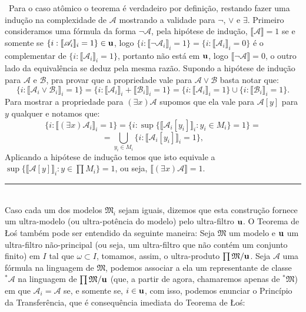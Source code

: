 \documentclass[12pt,a4paper]{article}
\def\dem{\par\smallbreak\noindent {\textit{ Demonstração:}} \ }
\def\eop{\hfill\rule{2.5mm}{2.5mm} \\ }
\theoremstyle{definition}
\begin{document}
\dem Para o caso atômico o teorema é verdadeiro por definição, restando fazer uma indução na complexidade de $\mathscr{A}$ mostrando a validade para $\neg$, $\vee$ e $\exists$. Primeiro consideramos uma fórmula da forma $\neg \mathscr{A}$, pela hipótese de indução, $ \llbracket \mathscr{A} \rrbracket=1$ se e somente se $\{i: \llbracket \mathscr{A}_i \rrbracket_i=1\}\in \bf{u}$, logo $\{i: \llbracket \neg \mathscr{A}_i \rrbracket_i=1\}=\{i: \llbracket \mathscr{A}_i \rrbracket_i=0\}$ é o complementar de  $\{i: \llbracket \mathscr{A}_i \rrbracket_i=1\}$, portanto não está em  $\bf{u}$, logo $ \llbracket \neg \mathscr{A} \rrbracket=0$, o outro lado da equivalência se deduz pela mesma razão. Supondo a hipótese de indução para $ \mathscr{A}$ e $ \mathscr{B}$, pra provar que a propriedade vale para $\mathscr{A} \vee \mathscr{B}$ basta notar que: $$\{i: \llbracket \mathscr{A}_i \vee \mathscr{B}_i \rrbracket_i=1\}=\{i: \llbracket \mathscr{A}_i \rrbracket_i + \llbracket \mathscr{B}_i \rrbracket_i=1\}=\{i: \llbracket \mathscr{A}_i \rrbracket_i =1\} \cup  \{ i: \llbracket \mathscr{B}_i \rrbracket_i=1\}.$$ Para mostrar a propriedade para $(\exists x)\mathscr{A}$ supomos que ela vale para $\mathscr{A}[y]$ para $y$ qualquer e notamos que: $$\{i: \llbracket (\exists x)\mathscr{A}_i \rrbracket_i=1\}= \{i:\sup \{ \llbracket \mathscr{A}_i[y_i] \rrbracket_i:y_i\in M_i\}=1\}=$$ $$=\bigcup_{y_i\in M_i} \{i: \llbracket \mathscr{A}_i[y_i] \rrbracket_i=1\},$$ Aplicando a hipótese de indução temos que isto equivale a $\sup \{ \llbracket \mathscr{A}[y] \rrbracket_i:y\in \prod M_i\}=1$, ou seja, $ \llbracket (\exists x)\mathscr{A}  \rrbracket = 1$. \eop

Caso cada um dos modelos $\mathfrak{M}_i$ sejam iguais, dizemos que esta construção fornece um ultra-modelo (ou ultra-potência do modelo) pelo ultra-filtro $\bf{u}$. O Teorema de Łoś também pode ser entendido da seguinte maneira: Seja $\mathfrak{M}$ um modelo e $\bf{u}$ um ultra-filtro não-principal (ou seja, um ultra-filtro que não contém um conjunto finito) em $I$ tal que $\omega\subset I$, tomamos, assim, o ultra-produto $\prod \mathfrak{M} / \bf{u}$. Seja $\mathscr{A}$ uma fórmula na linguagem de $\mathfrak{M}$, podemos associar a ela um representante de classe $^*\mathscr{A}$ na linguagem de $\prod \mathfrak{M} / \bf{u}$ (que, a partir de agora, chamaremos apenas de $^*\mathfrak{M}$) em que $\mathscr{A}_i=\mathscr{A}$ se, e somente se, $i\in \bf{u}$, com isso, podemos enunciar o Princípio da Transferência, que é consequência imediata do Teorema de Łoś: 
\end{document}
